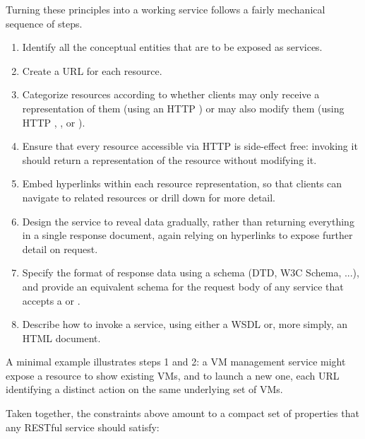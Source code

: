 Turning these principles into a working service follows a fairly mechanical sequence of steps.

\begin{enumerate}
    \item Identify all the conceptual entities that are to be exposed as services.
    \item Create a URL for each resource.
    \item Categorize resources according to whether clients may only receive a representation of them (using an HTTP ) or may also modify them (using HTTP , , or ).
    \item Ensure that every resource accessible via HTTP  is side-effect free: invoking it should return a representation of the resource without modifying it.
    \item Embed hyperlinks within each resource representation, so that clients can navigate to related resources or drill down for more detail.
    \item Design the service to reveal data gradually, rather than returning everything in a single response document, again relying on hyperlinks to expose further detail on request.
    \item Specify the format of response data using a schema (DTD, W3C Schema, ...), and provide an equivalent schema for the request body of any service that accepts a  or .
    \item Describe how to invoke a service, using either a WSDL or, more simply, an HTML document.
\end{enumerate}

A minimal example illustrates steps 1 and 2: a VM management service might expose a resource {\footnotesize {}} to show existing VMs, and {\footnotesize {}} to launch a new one, each URL identifying a distinct action on the same underlying set of VMs.

Taken together, the constraints above amount to a compact set of properties that any RESTful service should satisfy: 

